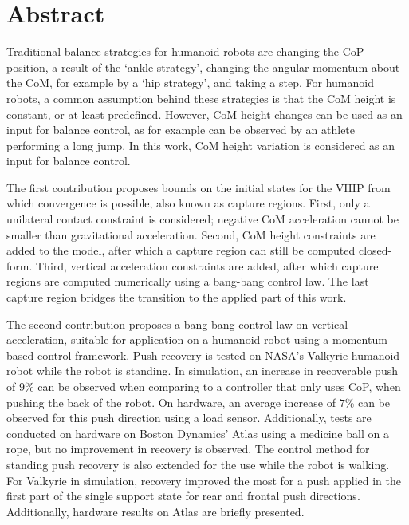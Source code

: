 %
\chapter*{Abstract}%

Traditional balance strategies for humanoid robots are changing the \ac{CoP} position, a result of the `ankle strategy', changing the angular momentum about the \ac{CoM}, for example by a `hip strategy', and taking a step. For humanoid robots, a common assumption behind these strategies is that the \ac{CoM} height is constant, or at least predefined. However, \ac{CoM} height changes can be used as an input for balance control, as for example can be observed by an athlete performing a long jump. In this work, \ac{CoM} height variation is considered as an input for balance control. 

The first contribution proposes bounds on the initial states for the \ac{VHIP} from which convergence is possible, also known as capture regions. First, only a unilateral contact constraint is considered; negative \ac{CoM} acceleration cannot be smaller than gravitational acceleration. Second, \ac{CoM} height constraints are added to the model, after which a capture region can still be computed closed-form. Third, vertical acceleration constraints are added, after which capture regions are computed numerically using a bang-bang control law. The last capture region bridges the transition to the applied part of this work.

The second contribution proposes a bang-bang control law on vertical acceleration, suitable for application on a humanoid robot using a momentum-based control framework. Push recovery is tested on NASA's Valkyrie humanoid robot while the robot is standing. In simulation, an increase in recoverable push of $9$\% can be observed when comparing to a controller that only uses \ac{CoP}, when pushing the back of the robot. On hardware, an average increase of $7$\% can be observed for this push direction using a load sensor. Additionally, tests are conducted on hardware on Boston Dynamics' Atlas using a medicine ball on a rope, but no improvement in recovery is observed. The control method for standing push recovery is also extended for the use while the robot is walking. For Valkyrie in simulation, recovery improved the most for a push applied in the first part of the single support state for rear and frontal push directions. Additionally, hardware results on Atlas are briefly presented.